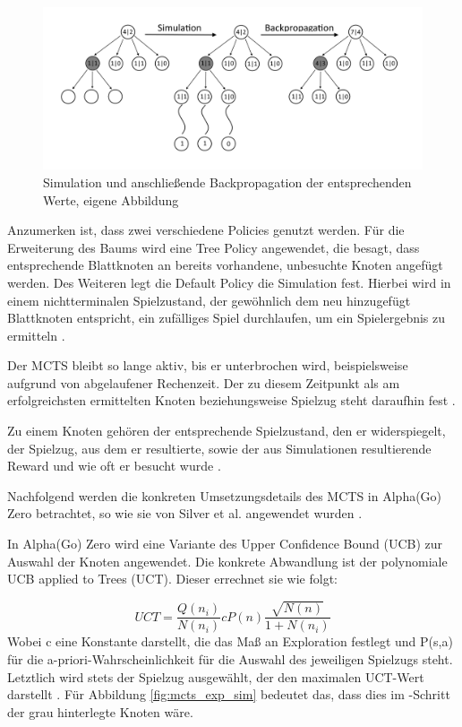 \documentclass[12pt,a4paper]{article}
\begin{document}
\begin{figure}
\centering
\includegraphics[width=1.0\textwidth]{pics/Backpropagation.png}
\caption{Simulation und anschließende Backpropagation der entsprechenden Werte, eigene Abbildung}
	\label{fig:mcts_backpropagation}
\end{figure}

Anzumerken ist, dass zwei verschiedene Policies genutzt werden. Für die Erweiterung des Baums wird eine Tree Policy angewendet, die besagt, dass entsprechende Blattknoten an bereits vorhandene, unbesuchte Knoten angefügt werden. Des Weiteren legt die Default Policy die Simulation fest. Hierbei wird in einem nichtterminalen Spielzustand, der gewöhnlich dem neu hinzugefügt Blattknoten entspricht, ein zufälliges Spiel durchlaufen, um ein Spielergebnis zu ermitteln \cite{Browne2012}. 

Der MCTS bleibt so lange aktiv, bis er unterbrochen wird, beispielsweise aufgrund von abgelaufener Rechenzeit. Der zu diesem Zeitpunkt als am erfolgreichsten ermittelten Knoten beziehungsweise Spielzug steht daraufhin fest \cite{Browne2012}.

Zu einem Knoten gehören der entsprechende Spielzustand, den er widerspiegelt, der Spielzug, aus dem er resultierte, sowie der aus Simulationen resultierende Reward und wie oft er besucht wurde \cite{Browne2012}.

Nachfolgend werden die konkreten Umsetzungsdetails des MCTS in Alpha(Go) Zero betrachtet, so wie sie von Silver et al. angewendet wurden \cite{Silver2017}.

In Alpha(Go) Zero wird eine Variante des Upper Confidence Bound (UCB) zur Auswahl der Knoten angewendet. Die konkrete Abwandlung ist der polynomiale UCB applied to Trees (UCT). Dieser errechnet sie wie folgt:

\begin{equation}
UCT = \frac{Q(n_i)}{N(n_i)} cP(n) \frac{\sqrt{N(n)}}{1+N(n_i)}
\end{equation} 
Wobei c eine Konstante darstellt, die das Maß an Exploration festlegt und P(s,a) für die a-priori-Wahrscheinlichkeit für die Auswahl des jeweiligen Spielzugs steht. Letztlich wird stets der Spielzug ausgewählt, der den maximalen UCT-Wert darstellt \cite{Silver2017}.
Für Abbildung \ref{fig:mcts_exp_sim} bedeutet das, dass dies im \grqq{}-Schritt der grau hinterlegte Knoten wäre.
\end{document}
